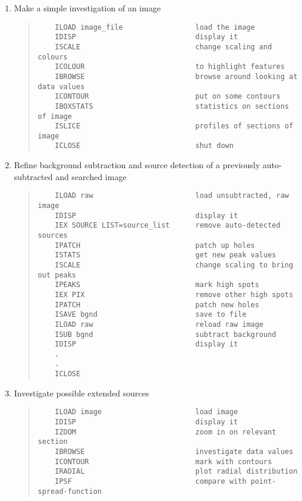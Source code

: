 \documentclass{book}
\renewcommand{\_}{{\tt\char'137}}     %
\begin{document}
\begin{enumerate}
\item Make a simple investigation of an image
\begin{quote}\begin{verbatim}
    ILOAD image_file                 load the image
    IDISP                            display it
    ISCALE                           change scaling and colours
    ICOLOUR                          to highlight features
    IBROWSE                          browse around looking at data values
    ICONTOUR                         put on some contours
    IBOXSTATS                        statistics on sections of image
    ISLICE                           profiles of sections of image
    ICLOSE                           shut down
\end{verbatim}\end{quote}
\item Refine background subtraction and source detection of a previously
auto-subtracted and searched image
\begin{quote}\begin{verbatim}
    ILOAD raw                        load unsubtracted, raw image
    IDISP                            display it
    IEX SOURCE LIST=source_list      remove auto-detected sources
    IPATCH                           patch up holes
    ISTATS                           get new peak values
    ISCALE                           change scaling to bring out peaks
    IPEAKS                           mark high spots
    IEX PIX                          remove other high spots
    IPATCH                           patch new holes
    ISAVE bgnd                       save to file
    ILOAD raw                        reload raw image
    ISUB bgnd                        subtract background
    IDISP                            display it
    .
    .
    ICLOSE
\end{verbatim}\end{quote}
\item Investigate possible extended sources
\begin{quote}\begin{verbatim}
    ILOAD image                      load image
    IDISP                            display it
    IZOOM                            zoom in on relevant section
    IBROWSE                          investigate data values
    ICONTOUR                         mark with contours
    IRADIAL                          plot radial distribution
    IPSF                             compare with point-spread-function

\end{verbatim}
\end{quote}
\end{enumerate}
\end{document}
